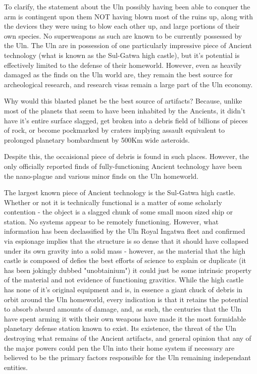To clarify, the statement about the Uln possibly having been able to
conquer the arm is contingent upon them NOT having blown most of the
ruins up, along with the devices they were using to blow each other
up, and large portions of their own species. No superweapons as such
are known to be currently possessed by the Uln. The Uln are in
possession of one particularly impressive piece of Ancient technology
(what is known as the Sul-Gatwa high castle), but it's potential is
effectively limited to the defense of their homeworld. However, even
as heavily damaged as the finds on the Uln world are, they remain the
best source for archeological research, and research visas remain a
large part of the Uln economy.

Why would this blasted planet be the best source of artifacts?
Because, unlike most of the planets that seem to have been inhabited
by the Ancients, it didn't have it's entire surface slagged, get
broken into a debris field of billions of pieces of rock, or become
pockmarked by craters implying assault equivalent to prolonged
planetary bombardment by 500Km wide asteroids.

Despite this, the occaisional piece of debris is found in such
places. However, the only officially reported finds of
fully-functioning Ancient technology have been the nano-plague and
various minor finds on the Uln homeworld.

The largest known piece of Ancient technology is the Sul-Gatwa high
castle. Whether or not it is technically functional is a matter of
some scholarly contention - the object is a slagged chunk of some
small moon sized ship or station. No systems appear to be remotely
functioning. However, what information has been declassified by the
Uln Royal Ingatwa fleet and confirmed via espionage implies that the
structure is so dense that it should have collapsed under its own
gravity into a solid mass - however, as the material that the high
castle is composed of defies the best efforts of science to explain or
duplicate (it has been jokingly dubbed "unobtainium") it could just be
some intrinsic property of the material and not evidence of
functioning gravitics. While the high castle has none of it's original
equipment and is, in essence a giant chuck of debris in orbit around
the Uln homeworld, every indication is that it retains the potential
to absorb absurd amounts of damage, and, as such, the centuries that
the Uln have spent arming it with their own weapons have made it the
most formidable planetary defense station known to exist. Its
existence, the threat of the Uln destroying what remains of the
Ancient artifacts, and general opinion that any of the major powers
could pen the Uln into their home system if necessary are believed to
be the primary factors responsible for the Uln remaining independant
entities.

